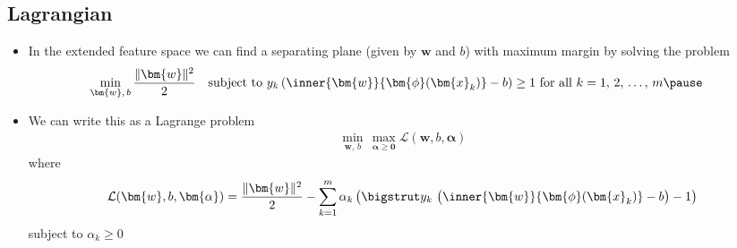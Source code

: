 
\begin{slide}
\section[-2]{Lagrangian}

\begin{PauseHighLight}
  \begin{itemize}
  \item In the extended feature space we can find a separating
    plane (given by $\bm{w}$ and $b$) with maximum margin by solving
    the problem
   \begin{align*}
     \hspace*{-1em} \min_{\bm{w},\,b} \frac{\|\bm{w}\|^2}{2} \quad 
     \mbox{subject to $y_k\left(\inner{\bm{w}}{\bm{\phi}(\bm{x}_k)} -
     b\right) \geq 1$ for all $k=1,\,2,\,\ldots,\,m$}\pause
    \end{align*}
  \item We can write this as a Lagrange problem
    \begin{align*}
      \min_{\bm{w},\,b} \, \max_{\bm{\alpha}\geq\bm{0}} \mathcal{L}(\bm{w},b,\bm{\alpha})
    \end{align*}
    where
    \begin{align*}
      \mathcal{L}(\bm{w},b,\bm{\alpha}) = \frac{\|\bm{w}\|^2}{2}
      - \sum_{k=1}^m \alpha_k \left(\bigstrut  y_k\,\left( \strut\inner{\bm{w}}{\bm{\phi}(\bm{x}_k)} -
     b\right) - 1\right)
    \end{align*}
    subject to $\alpha_k \geq 0$\pause
  \end{itemize}
\end{PauseHighLight}


\end{slide}




